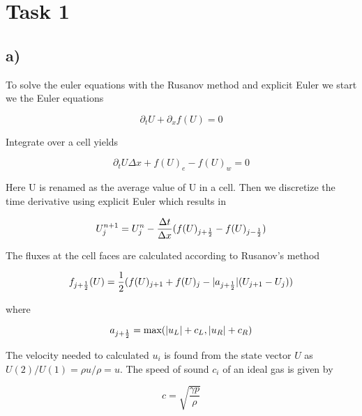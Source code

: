 \documentclass{article}
\begin{document}

\section{Task 1}

\subsection{a)}

To solve the euler equations with the Rusanov method and explicit Euler we start we the Euler equations

\begin{equation}
\partial_t U + \partial_x f(U)  = 0
\end{equation}

Integrate over a cell yields

\begin{equation}
\partial_t U \Delta x + f(U)_e - f(U)_w = 0
\end{equation}

Here U is renamed as the average value of U in a cell. Then we discretize the time derivative using explicit Euler which results in

\begin{equation}
U_j^{n+1}  = U_j^n - \frac{\Delta t}{\Delta x} ( f(U)_{j+\frac{1}{2}} - f(U)_{j-\frac{1}{2}} )
\end{equation}

The fluxes at the cell faces are calculated according to Rusanov's method

\begin{equation}
f_{j+\frac{1}{2}}(U) = \frac{1}{2} (f(U)_{j+1} + f(U)_j - |a_{j+\frac{1}{2}}| (U_{j+1} - U_j) )
\end{equation}

where 

\begin{equation}
a_{j+\frac{1}{2}} = \text{max}(|u_L| + c_L, |u_R| + c_R)
\end{equation}

The velocity needed to calculated $u_{i}$ is found from the state vector $U$ as $U(2)/U(1) = \rho u /\rho = u$. The speed of sound $c_i$ of an ideal gas is given by

\begin{equation}
c = \sqrt{\frac{\gamma p }{\rho}}
\end{equation}
\end{document}
